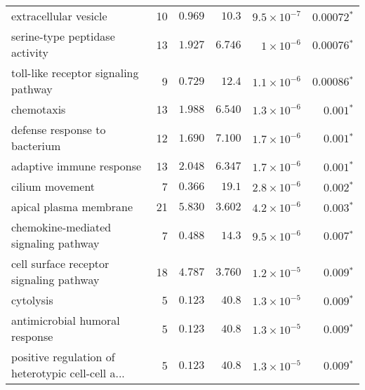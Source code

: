 \begin{longtable}{|l|r|r|r|r|r|}
                             extracellular vesicle &                      10 &                $ 0.969$ &   $  10.3$ &  $9.5\times 10^{-7}$ &             $\bm{0.00072{^*}}$ \\
                    serine-type peptidase activity &                      13 &                $ 1.927$ &   $ 6.746$ &   $ 1\times 10^{-6}$ &             $\bm{0.00076{^*}}$ \\
              toll-like receptor signaling pathway &                       9 &                $ 0.729$ &   $  12.4$ &  $1.1\times 10^{-6}$ &             $\bm{0.00086{^*}}$ \\
                                        chemotaxis &                      13 &                $ 1.988$ &   $ 6.540$ &  $1.3\times 10^{-6}$ &              $\bm{ 0.001{^*}}$ \\
                     defense response to bacterium &                      12 &                $ 1.690$ &   $ 7.100$ &  $1.7\times 10^{-6}$ &              $\bm{ 0.001{^*}}$ \\
                          adaptive immune response &                      13 &                $ 2.048$ &   $ 6.347$ &  $1.7\times 10^{-6}$ &              $\bm{ 0.001{^*}}$ \\
                                   cilium movement &                       7 &                $ 0.366$ &   $  19.1$ &  $2.8\times 10^{-6}$ &              $\bm{ 0.002{^*}}$ \\
                            apical plasma membrane &                      21 &                $ 5.830$ &   $ 3.602$ &  $4.2\times 10^{-6}$ &              $\bm{ 0.003{^*}}$ \\
              chemokine-mediated signaling pathway &                       7 &                $ 0.488$ &   $  14.3$ &  $9.5\times 10^{-6}$ &              $\bm{ 0.007{^*}}$ \\
           cell surface receptor signaling pathway &                      18 &                $ 4.787$ &   $ 3.760$ &  $1.2\times 10^{-5}$ &              $\bm{ 0.009{^*}}$ \\
                                         cytolysis &                       5 &                $ 0.123$ &   $  40.8$ &  $1.3\times 10^{-5}$ &              $\bm{ 0.009{^*}}$ \\
                    antimicrobial humoral response &                       5 &                $ 0.123$ &   $  40.8$ &  $1.3\times 10^{-5}$ &              $\bm{ 0.009{^*}}$ \\
 positive regulation of heterotypic cell-cell a... &                       5 &                $ 0.123$ &   $  40.8$ &  $1.3\times 10^{-5}$ &              $\bm{ 0.009{^*}}$ \\

\end{longtable}

